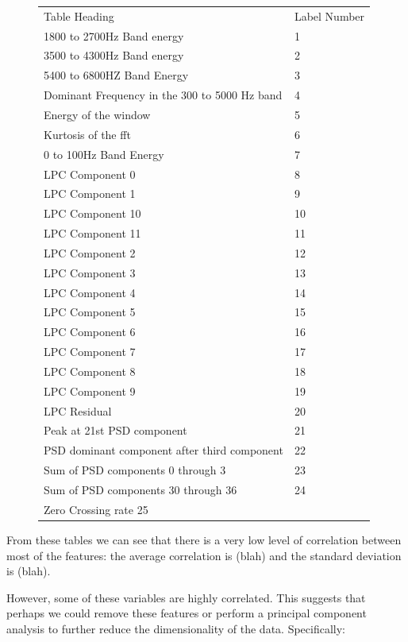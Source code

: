 \documentclass[ %
                    author={Sam Phippen},
                supervisor={Dr. Rafal Bogacz},
                     title={Real time voice activity detectors in noisy personal computing environments},
                  subtitle={},
                    degree={MEng},
                      year={2012} ]{thesis}
\begin{document}
\begin{figure}
    \begin{tabular}{ |l|l| }
        Table Heading & Label Number \\
        1800 to 2700Hz Band energy & 1 \\
        3500 to 4300Hz Band energy & 2 \\
        5400 to 6800HZ Band Energy & 3 \\
        Dominant Frequency in the 300 to 5000 Hz band & 4 \\
        Energy of the window & 5 \\
        Kurtosis of the fft & 6 \\
        0 to 100Hz Band Energy & 7 \\
        LPC Component 0 & 8 \\
        LPC Component 1 & 9 \\
        LPC Component 10 & 10 \\
        LPC Component 11 & 11 \\
        LPC Component 2 & 12 \\
        LPC Component 3 & 13 \\
        LPC Component 4 & 14 \\
        LPC Component 5 & 15 \\
        LPC Component 6 & 16 \\
        LPC Component 7 & 17 \\
        LPC Component 8 & 18 \\
        LPC Component 9 & 19 \\
        LPC Residual & 20 \\
        Peak at 21st PSD component & 21 \\
        PSD dominant component after third component & 22 \\
        Sum of PSD components 0 through 3 & 23 \\
        Sum of PSD components 30 through 36 & 24 \\
        Zero Crossing rate 25 & \\
    \end{tabular}
\end{figure}

From these tables we can see that there is a very low level of correlation
between most of the features: the average correlation is (blah) and the
standard deviation is (blah).

However, some of these variables are highly correlated. This suggests that
perhaps we could remove these features or perform a principal component
analysis to further reduce the dimensionality of the data. Specifically:
\end{document}
